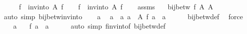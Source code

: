 \begin{isabellebody}
%
\isadelimproof
%
\endisadelimproof
%
\isatagproof
{}\isamarkupfalse%
\ {\isacharminus}{\kern0pt}\isanewline
\ \ \isamarkupfalse%
\ {\isacharquery}{\kern0pt}f{\isacharprime}{\kern0pt}\ {\isacharequal}{\kern0pt}\ {\isachardoublequoteopen}inv{\isacharunderscore}{\kern0pt}into\ A\ f{\isachardoublequoteclose}\isanewline
\ \ \isamarkupfalse%
\ {\isacharquery}{\kern0pt}f{\isacharprime}{\kern0pt}{\isacharprime}{\kern0pt}\ {\isacharequal}{\kern0pt}\ {\isachardoublequoteopen}inv{\isacharunderscore}{\kern0pt}into\ A{\isacharprime}{\kern0pt}\ {\isacharquery}{\kern0pt}f{\isacharprime}{\kern0pt}{\isachardoublequoteclose}\isanewline
\ \ \isamarkupfalse%
\ assms\ \isamarkupfalse%
\ {\isacharasterisk}{\kern0pt}{\isacharcolon}{\kern0pt}\ {\isachardoublequoteopen}bij{\isacharunderscore}{\kern0pt}betw\ {\isacharquery}{\kern0pt}f{\isacharprime}{\kern0pt}\ A{\isacharprime}{\kern0pt}\ A{\isachardoublequoteclose}\isanewline
\ \ \ \ \isamarkupfalse%
\ {\isacharparenleft}{\kern0pt}auto\ simp{\isacharcolon}{\kern0pt}\ bij{\isacharunderscore}{\kern0pt}betw{\isacharunderscore}{\kern0pt}inv{\isacharunderscore}{\kern0pt}into{\isacharparenright}{\kern0pt}\isanewline
\ \ \isamarkupfalse%
\ a\ \isamarkupfalse%
\ a{\isacharprime}{\kern0pt}\ \ a{\isacharprime}{\kern0pt}{\isacharcolon}{\kern0pt}\ {\isachardoublequoteopen}a{\isacharprime}{\kern0pt}\ {\isasymin}\ A{\isacharprime}{\kern0pt}{\isachardoublequoteclose}\ {\isachardoublequoteopen}{\isacharquery}{\kern0pt}f{\isacharprime}{\kern0pt}\ a{\isacharprime}{\kern0pt}\ {\isacharequal}{\kern0pt}\ a{\isachardoublequoteclose}\isanewline
\ \ \ \ \isamarkupfalse%
\ bij{\isacharunderscore}{\kern0pt}betw{\isacharunderscore}{\kern0pt}def\ \isamarkupfalse%
\ force\isanewline
\ \ \isamarkupfalse%
\ a\ {\isacharasterisk}{\kern0pt}\ \isamarkupfalse%
\ {\isachardoublequoteopen}{\isacharquery}{\kern0pt}f{\isacharprime}{\kern0pt}{\isacharprime}{\kern0pt}\ a\ {\isacharequal}{\kern0pt}\ a{\isacharprime}{\kern0pt}{\isachardoublequoteclose}\isanewline
\ \ \ \ \isamarkupfalse%
\ {\isacharparenleft}{\kern0pt}auto\ simp{\isacharcolon}{\kern0pt}\ f{\isacharunderscore}{\kern0pt}inv{\isacharunderscore}{\kern0pt}into{\isacharunderscore}{\kern0pt}f\ bij{\isacharunderscore}{\kern0pt}betw{\isacharunderscore}{\kern0pt}def{\isacharparenright}{\kern0pt}\isanewline
\ \ \isamarkupfalse%
\ \isamarkupfalse%

\end{isabellebody}
